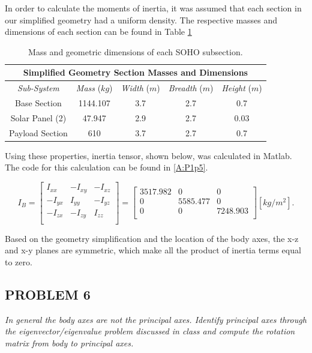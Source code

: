\documentclass[12pt,a4paper,notitlepage]{article}
\begin{document}
In order to calculate the moments of inertia, it was assumed that each section in our simplified geometry had a uniform density. The respective masses and dimensions of each section can be found in Table \ref{table:dimensions}

\begin{table}[h!]
\begin{center}
\begin{tabular}{ |c||c|c|c|c|}
 \hline
 \multicolumn{5}{||c||}{\textbf{Simplified Geometry Section Masses and Dimensions}} \\
 \hline
 \textit{Sub-System}& \textit{Mass} ($kg$) &\textit{Width} ($m$)&\textit{Breadth} ($m$) &\textit{Height} ($m$)\\
\hline
Base Section& 1144.107 & 3.7 & 2.7 & 0.7 \\ 
\hline
Solar Panel (2)& 47.947 & 2.9 & 2.7 & 0.03 \\ 
\hline
Payload Section& 610 & 3.7 & 2.7 & 0.7 \\ 
\hline
\end{tabular}
\caption{Mass and geometric dimensions of each SOHO subsection.}
\label{table:dimensions}
\end{center}
\end{table}

Using these properties, inertia tensor, shown below, was calculated in Matlab. The code for this calculation can be found in \ref{A:P1p5}.

\begin{equation}
I_{B} =
\begin{bmatrix} 
I_{xx} & -I_{xy} & -I_{xz} \\
-I_{yx} & I_{yy} & -I_{yz} \\ 
-I_{zx} & -I_{zy} & I_{zz} \\
\end{bmatrix}
 =
\begin{bmatrix}
3517.982 & 0 & 0 \\
0 & 5585.477 & 0 \\ 
0 & 0 & 7248.903 \\
\end{bmatrix}
[kg/m^2].
\end{equation}

Based on the geometry simplification and the location of the body axes, the x-z and x-y planes are symmetric, which make all the product of inertia terms equal to zero.

\subsection{PROBLEM 6} \label{principal_axes}
\textit{In general the body axes are not the principal axes. Identify principal axes through the
eigenvector/eigenvalue problem discussed in class and compute the rotation matrix from body to principal
axes.}
\end{document}

